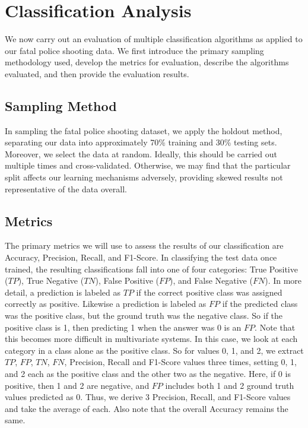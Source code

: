 \documentclass[10pt, conference, compsocconf]{IEEEtran}
\begin{document}
\section{Classification Analysis}\label{classification}

We now carry out an evaluation of multiple classification algorithms as applied to our fatal police shooting data. We first introduce the primary sampling methodology used, develop the metrics for evaluation, describe the algorithms evaluated, and then provide the evaluation results.

\subsection{Sampling Method}

In sampling the fatal police shooting dataset, we apply the holdout method, separating our data into approximately 70\% training and 30\% testing sets. Moreover, we select the data at random. Ideally, this should be carried out multiple times and cross-validated. Otherwise, we may find that the particular split affects our learning mechanisms adversely, providing skewed results not representative of the data overall.  

\subsection{Metrics}

The primary metrics we will use to assess the results of our classification are Accuracy, Precision, Recall, and F1-Score. In classifying the test data once trained, the resulting classifications fall into one of four categories: True Positive ($TP$), True Negative ($TN$), False Positive ($FP$), and False Negative ($FN$). In more detail, a prediction is labeled as $TP$ if the correct positive class was assigned correctly as positive. Likewise a prediction is labeled as $FP$ if the predicted class was the positive class, but the ground truth was the negative class. So if the positive class is 1, then predicting 1 when the answer was 0 is an $FP$. Note that this becomes more difficult in multivariate systems. In this case, we look at each category in a class alone as the positive class. So for values 0, 1, and 2, we extract $TP$, $FP$, $TN$, $FN$, Precision, Recall and F1-Score values three times, setting 0, 1, and 2 each as the positive class and the other two as the negative. Here, if 0 is positive, then 1 and 2 are negative, and $FP$ includes both 1 and 2 ground truth values predicted as 0. Thus, we derive 3 Precision, Recall, and F1-Score values and take the average of each. Also note that the overall Accuracy remains the same.
\end{document}
